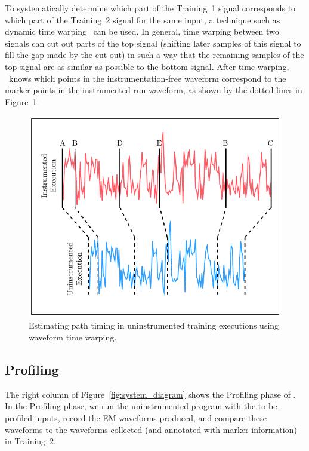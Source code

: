 To systematically determine which part of the Training~1 signal corresponds to which part of the Training~2 signal for the same input, a technique such as dynamic time warping~\cite{senin2008} can be used. In general, time warping between two signals can cut out parts of the top signal (shifting later samples of this signal to fill the gap made by the cut-out) in such a way that the remaining samples of the top signal are as similar as possible to the bottom signal. After time warping, \zop\ knows which points in the instrumentation-free waveform correspond to the marker points in the instrumented-run waveform, as shown by the dotted lines in Figure~\ref{fig:time_warp}.

\begin{figure}[t]
\centering
\includegraphics[width=5in]{../issta_profile/profiling/figures/time_warp}
\caption{Estimating path timing in uninstrumented training executions using waveform time warping.}
\label{fig:time_warp}
\end{figure}

\subsection{Profiling}
\label{sec:profiling}

The right column of Figure~\ref{fig:system_diagram} shows the Profiling phase of \zop. In the Profiling phase, we run the uninstrumented program with the to-be-profiled inputs, record the EM waveforms produced, and compare these waveforms to the waveforms collected (and annotated with marker information) in Training~2.

